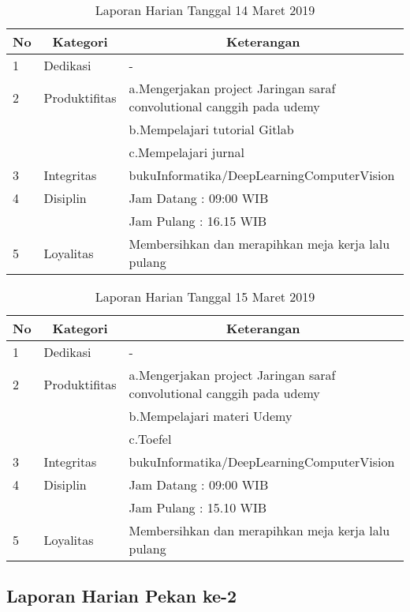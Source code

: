 \begin{table}[htp]
\caption{Laporan Harian Tanggal 14 Maret 2019}
\label{tab:lh140319}
\begin{tabular}{|l|l|l|}
\hline
\textbf{No} & \multicolumn{1}{c|}{\textbf{Kategori}} & \multicolumn{1}{c|}{\textbf{Keterangan}} \\ \hline
1 & Dedikasi & - \\ \hline
2 & Produktifitas & a.Mengerjakan project Jaringan saraf convolutional canggih pada udemy \\
   & & b.Mempelajari tutorial Gitlab \\ \hline
   & & c.Mempelajari jurnal \\ \hline
3 & Integritas & bukuInformatika/DeepLearningComputerVision \\ \hline
4 & Disiplin & Jam Datang : 09:00 WIB \\
   &  & Jam Pulang : 16.15 WIB \\ \hline
5 & Loyalitas & Membersihkan dan merapihkan meja kerja lalu pulang \\ \hline
\end{tabular}
\end{table}


\begin{table}[htp]
\caption{Laporan Harian Tanggal 15 Maret 2019}
\label{tab:lh150319}
\begin{tabular}{|l|l|l|}
\hline
\textbf{No} & \multicolumn{1}{c|}{\textbf{Kategori}} & \multicolumn{1}{c|}{\textbf{Keterangan}} \\ \hline
1 & Dedikasi & - \\ \hline
2 & Produktifitas & a.Mengerjakan project Jaringan saraf convolutional canggih pada udemy \\
   & & b.Mempelajari materi Udemy \\ \hline
   & & c.Toefel \\ \hline
3 & Integritas & bukuInformatika/DeepLearningComputerVision \\ \hline
4 & Disiplin & Jam Datang : 09:00 WIB \\
   &  & Jam Pulang : 15.10 WIB \\ \hline
5 & Loyalitas & Membersihkan dan merapihkan meja kerja lalu pulang \\ \hline
\end{tabular}
\end{table}


\subsection{Laporan Harian Pekan ke-2}


